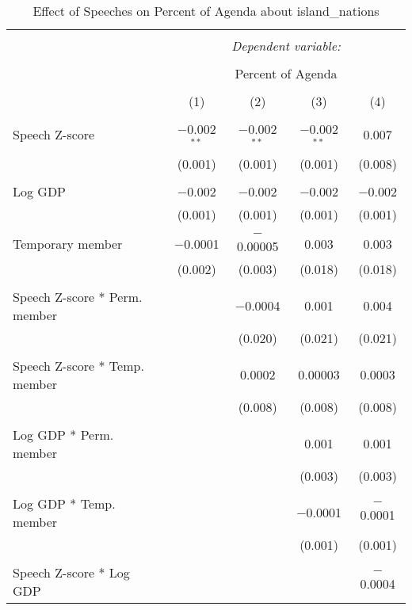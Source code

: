 
\begin{table}[!htbp] \centering 
  \caption{Effect of Speeches on Percent of Agenda about island_nations} 
  \label{} 
\begin{tabular}{@{\extracolsep{5pt}}lcccc} 
\\[-1.8ex]\hline 
\hline \\[-1.8ex] 
 & \multicolumn{4}{c}{\textit{Dependent variable:}} \\ 
\cline{2-5} 
\\[-1.8ex] & \multicolumn{4}{c}{Percent of Agenda} \\ 
\\[-1.8ex] & (1) & (2) & (3) & (4)\\ 
\hline \\[-1.8ex] 
 Speech Z-score & $-$0.002$^{**}$ & $-$0.002$^{**}$ & $-$0.002$^{**}$ & 0.007 \\ 
  & (0.001) & (0.001) & (0.001) & (0.008) \\ 
  & & & & \\ 
 Log GDP & $-$0.002 & $-$0.002 & $-$0.002 & $-$0.002 \\ 
  & (0.001) & (0.001) & (0.001) & (0.001) \\ 
  & & & & \\ 
 Temporary member & $-$0.0001 & $-$0.00005 & 0.003 & 0.003 \\ 
  & (0.002) & (0.003) & (0.018) & (0.018) \\ 
  & & & & \\ 
 Speech Z-score * Perm. member &  & $-$0.0004 & 0.001 & 0.004 \\ 
  &  & (0.020) & (0.021) & (0.021) \\ 
  & & & & \\ 
 Speech Z-score * Temp. member &  & 0.0002 & 0.00003 & 0.0003 \\ 
  &  & (0.008) & (0.008) & (0.008) \\ 
  & & & & \\ 
 Log GDP * Perm. member &  &  & 0.001 & 0.001 \\ 
  &  &  & (0.003) & (0.003) \\ 
  & & & & \\ 
 Log GDP * Temp. member &  &  & $-$0.0001 & $-$0.0001 \\ 
  &  &  & (0.001) & (0.001) \\ 
  & & & & \\ 
 Speech Z-score * Log GDP &  &  &  & $-$0.0004 \\ 

\end{tabular}
\end{table}
